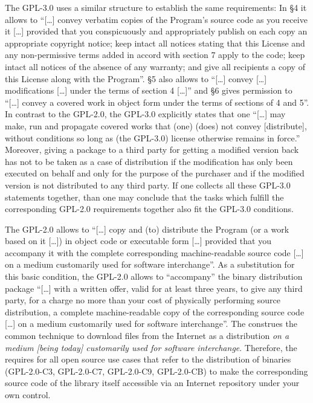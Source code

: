 \label{Gpl3ConditionsDistri}
The GPL-3.0 uses a similar structure to establish the same requirements: In §4
it allows to \enquote{[\ldots] convey verbatim copies of the Program's source
code as you receive it [\ldots] provided that you conspicuously and
appropriately publish on each copy an appropriate copyright notice; keep
intact all notices stating that this License and any non-permissive terms
added in accord with section 7 apply to the code; keep intact all notices of
the absence of any warranty; and give all recipients a copy of this License
along with the Program}. §5 also allows to \enquote{[\ldots] convey [\ldots]
modifications [\ldots] under the terms of section 4 [\ldots]} and §6 gives
permission to \enquote{[\ldots] convey a covered work in object form under the
terms of sections of 4 and 5}. In contrast to the
GPL-2.0, the GPL-3.0 explicitly states that one \enquote{[\ldots] may make, run
and propagate covered works that (one) (does) not convey [distribute], without
conditions so long as (the GPL-3.0) license otherwise remains in
force.}
Moreover, giving a package to a third party for getting a modified version back
has not to be taken as a case of distribution if the modification has only been
executed on behalf and only for the purpose of the purchaser and if the modified
version is not distributed to any third party. If one collects
all these GPL-3.0 statements together, than one may conclude that the tasks
which fulfill the corresponding GPL-2.0 requirements together also fit the
GPL-3.0 conditions.
  
The GPL-2.0 allows to \enquote{[\ldots] copy and (to) distribute the Program (or
a work based on it [\ldots]) in object code or executable form [\ldots] provided
that you accompany it with the complete corresponding machine-readable source
code [\ldots] on a medium customarily used for software
interchange}. As a substitution for this basic condition,
the GPL-2.0 allows to \enquote{accompany} the binary distribution package
\enquote{[\ldots] with a written offer, valid for at least three years, to give
any third party, for a charge no more than your cost of physically performing
source distribution, a complete machine-readable copy of the corresponding
source code [\ldots] on a medium customarily used for software
interchange}. The \oslic{} construes the common technique to
download files from the Internet as a distribution \emph{on a medium [being
today] customarily used for software interchange}. Therefore, the \oslic{} requires
for all open source use cases that refer to the distribution of binaries
(GPL-2.0-C3, GPL-2.0-C7, GPL-2.0-C9, GPL-2.0-CB) to make the corresponding
source code of the library itself accessible via an Internet repository under
your own control. 
  
